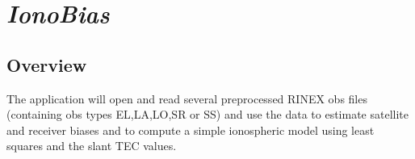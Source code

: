 %
%


\section{\emph{IonoBias}}
\subsection{Overview}
The application will open and read several preprocessed RINEX obs files (containing obs types EL,LA,LO,SR or SS) and use the data to estimate satellite and receiver biases and to compute a simple ionospheric model using least squares and the slant TEC values.

